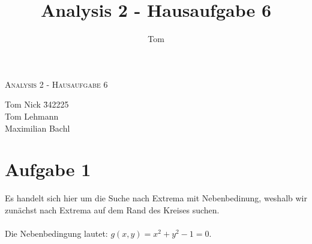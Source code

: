 \documentclass[10pt,a4paper,parskip=half]{scrartcl}
\author{Tom}
\title{Analysis 2 - Hausaufgabe 6}
\begin{document}
\begin{center}
\textsc{\Large{Analysis 2 - Hausaufgabe 6}} \\
\end{center}
\begin{tabbing}
Tom Nick \hspace{1.4cm}\= 342225\\
Tom Lehmann\\
Maximilian Bachl
\end{tabbing}
\section*{Aufgabe 1}
Es handelt sich hier um die Suche nach Extrema mit Nebenbedinung, weshalb wir zunächst nach Extrema auf dem Rand des Kreises suchen.\\\\
Die Nebenbedingung lautet: $g(x,y) = x^2 + y^2 - 1 = 0$.
\end{document}
